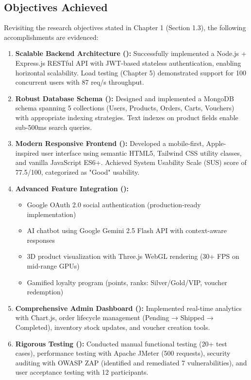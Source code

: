 \subsection{Objectives Achieved}

Revisiting the research objectives stated in Chapter 1 (Section 1.3), the following accomplishments are evidenced:

\begin{enumerate}
    \item \textbf{Scalable Backend Architecture (\checkmark):} Successfully implemented a Node.js + Express.js RESTful API with JWT-based stateless authentication, enabling horizontal scalability. Load testing (Chapter 5) demonstrated support for 100 concurrent users with 87 req/s throughput.
    
    \item \textbf{Robust Database Schema (\checkmark):} Designed and implemented a MongoDB schema spanning 5 collections (Users, Products, Orders, Carts, Vouchers) with appropriate indexing strategies. Text indexes on product fields enable sub-500ms search queries.
    
    \item \textbf{Modern Responsive Frontend (\checkmark):} Developed a mobile-first, Apple-inspired user interface using semantic HTML5, Tailwind CSS utility classes, and vanilla JavaScript ES6+. Achieved System Usability Scale (SUS) score of 77.5/100, categorized as "Good" usability.
    
    \item \textbf{Advanced Feature Integration (\checkmark):} 
    \begin{itemize}
        \item Google OAuth 2.0 social authentication (production-ready implementation)
        \item AI chatbot using Google Gemini 2.5 Flash API with context-aware responses
        \item 3D product visualization with Three.js WebGL rendering (30+ FPS on mid-range GPUs)
        \item Gamified loyalty program (points, ranks: Silver/Gold/VIP, voucher redemption)
    \end{itemize}
    
    \item \textbf{Comprehensive Admin Dashboard (\checkmark):} Implemented real-time analytics with Chart.js, order lifecycle management (Pending → Shipped → Completed), inventory stock updates, and voucher creation tools.
    
    \item \textbf{Rigorous Testing (\checkmark):} Conducted manual functional testing (20+ test cases), performance testing with Apache JMeter (500 requests), security auditing with OWASP ZAP (identified and remediated 7 vulnerabilities), and user acceptance testing with 12 participants.
\end{enumerate}

